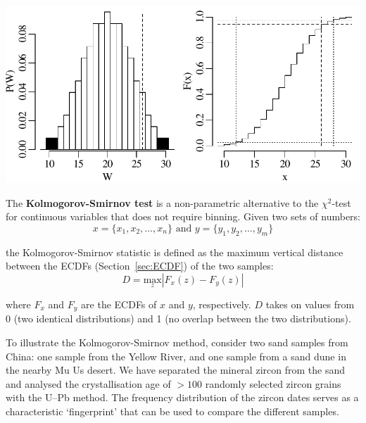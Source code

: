 \noindent\begin{minipage}[t][][b]{.6\textwidth}
  \includegraphics[]{../figures/wilcox.pdf}\medskip
\end{minipage}
\begin{minipage}[t][][t]{.4\textwidth}
  \label{fig:wilcox}
\end{minipage}

The \textbf{Kolmogorov-Smirnov test} is a non-parametric alternative
to the $\chi^2$-test for continuous variables that does not require
binning. Given two sets of numbers:
\[
x = \{x_1,x_2,\ldots,x_n\} \mbox{~and~} y = \{y_1,y_2,\ldots,y_m\}
\]

\noindent the Kolmogorov-Smirnov statistic is defined as the maximum
vertical distance between the ECDFs (Section~\ref{sec:ECDF}) of the
two samples:
\begin{equation}
  D = \underset{z}{\mbox{max}} |F_x(z) - F_y(z)|
  \label{eq:KS}
\end{equation}

\noindent where $F_x$ and $F_y$ are the ECDFs of $x$ and $y$,
respectively.  $D$ takes on values from 0 (two identical
distributions) and 1 (no overlap between the two distributions).\medskip

To illustrate the Kolmogorov-Smirnov method, consider two sand samples
from China: one sample from the Yellow River, and one sample from a
sand dune in the nearby Mu Us desert. We have separated the mineral
zircon from the sand and analysed the crystallisation age of $>100$
randomly selected zircon grains with the U--Pb method.  The frequency
distribution of the zircon dates serves as a characteristic
`fingerprint' that can be used to compare the different samples.

